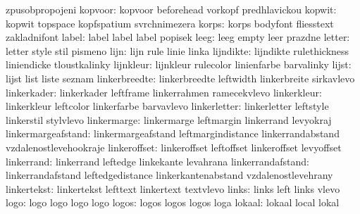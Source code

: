                        zpusobpropojeni
             kopvoor:  kopvoor              beforehead           vorkopf
                       predhlavickou
              kopwit:  kopwit               topspace             kopfspatium
                       svrchnimezera
               korps:  korps                bodyfont             fliesstext
                       zakladnifont
               label:  label                label                label
                       popisek
                leeg:  leeg                 empty                leer
                       prazdne
              letter:  letter               style                stil
                       pismeno
                lijn:  lijn                 rule                 linie
                       linka
           lijndikte:  lijndikte            rulethickness        liniendicke
                       tloustkalinky
           lijnkleur:  lijnkleur            rulecolor            linienfarbe
                       barvalinky
               lijst:  lijst                list                 liste
                       seznam
       linkerbreedte:  linkerbreedte        leftwidth            linkerbreite
                       sirkavlevo
         linkerkader:  linkerkader          leftframe            linkerrahmen
                       ramecekvlevo
         linkerkleur:  linkerkleur          leftcolor            linkerfarbe
                       barvavlevo
        linkerletter:  linkerletter         leftstyle            linkerstil
                       stylvlevo
         linkermarge:  linkermarge          leftmargin           linkerrand
                       levyokraj
  linkermargeafstand:  linkermargeafstand   leftmargindistance   linkerrandabstand
                       vzdalenostlevehookraje
        linkeroffset:  linkeroffset         leftoffset           linkeroffset
                       levyoffset
          linkerrand:  linkerrand           leftedge             linkekante
                       levahrana
   linkerrandafstand:  linkerrandafstand    leftedgedistance     linkerkantenabstand
                       vzdalenostlevehrany
         linkertekst:  linkertekst          lefttext             linkertext
                       textvlevo
               links:  links                left                 links
                       vlevo
                logo:  logo                 logo                 logo
                       logo
               logos:  logos                logos                logos
                       loga
              lokaal:  lokaal               local                lokal
